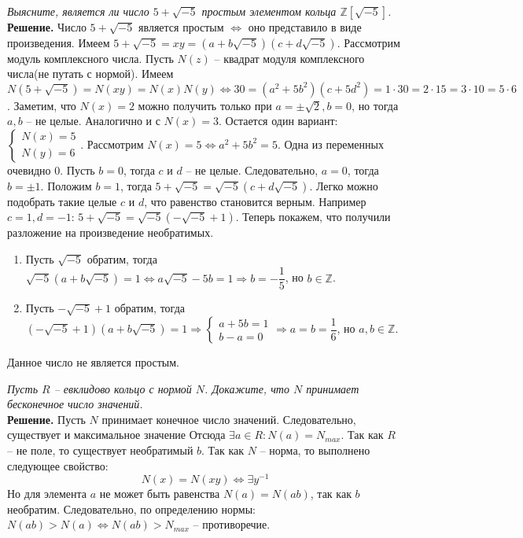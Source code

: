 \documentclass[a4paper, 12pt]{article}
\newcommand{\Z}{\mathbb{Z}}
\newcommand{\N}{\mathbb{N}}
\begin{document}
\begin{spacing}{1}
\begin{center}
\end{center}

\noindent \textit{Выясните, является ли число $5+\sqrt{-5}$ простым элементом кольца $\Z[\sqrt{-5}]$.}\\
\noindent \textbf{Решение.} Число $5+\sqrt{-5}$ является простым $\Leftrightarrow$ оно представило в виде произведения. Имеем $5+\sqrt{-5} = xy =(a + b\sqrt{-5})(c + d\sqrt{-5})$. Рассмотрим модуль комплексного числа. Пусть $N(z)$ -- квадрат модуля комплексного числа(не путать с нормой). Имеем $N(5+\sqrt{-5})= N(xy) = N(x)N(y) \Leftrightarrow30 = (a^2 + 5b^2)(c + 5d^2) = 1 \cdot 30 = 2 \cdot 15 = 3 \cdot 10 = 5\cdot 6$. Заметим, что $N(x) = 2$ можно получить только при $a = \pm\sqrt2, b = 0$, но тогда $a, b$ -- не целые. Аналогично и с $N(x) = 3$. Остается один вариант: $\begin{cases}
N(x) = 5\\N(y) = 6
\end{cases}$. Рассмотрим $N(x) = 5 \Leftrightarrow a^2 + 5b^2 = 5$. Одна из переменных очевидно 0. Пусть $b = 0$, тогда $c$ и $d$ -- не целые. Следовательно, $a = 0$, тогда $b = \pm 1$. Положим $b = 1$, тогда $5+\sqrt{-5} = \sqrt{-5}(c + d\sqrt{-5})$. Легко можно подобрать такие целые $c$ и $d$, что равенство становится верным. Например $c = 1, d = -1$:
$5+\sqrt{-5} = \sqrt{-5}(-\sqrt{-5} + 1)$. Теперь покажем, что получили разложение на произведение необратимых. 
\begin{enumerate}
	\item Пусть $\sqrt{-5}$ обратим, тогда $\sqrt{-5}(a + b\sqrt{-5}) = 1 \Leftrightarrow a\sqrt{-5} - 5b = 1 \Rightarrow b = -\dfrac{1}{5}$, но $b \in \Z$.
	\item Пусть $-\sqrt{-5} + 1$ обратим, тогда $(-\sqrt{-5} + 1)(a+b\sqrt{-5}) = 1 \Rightarrow \begin{cases}
	a + 5b = 1\\ b - a = 0\end{cases}\Rightarrow a = b = \dfrac{1}{6}$, но $a,b \in \Z$.
\end{enumerate}
Данное число не является простым.
\end{spacing}



\begin{center}
\end{center}

\noindent \textit{Пусть $R$ -- евклидово кольцо с нормой $N$. Докажите, что $N$ принимает бесконечное число значений.}\\
\noindent \textbf{Решение.} Пусть $N$ принимает конечное число значений. Следовательно, существует и максимальное значение Отсюда $\exists a \in R: N(a) = N_{max}$. Так как $R$ -- не поле, то существует необратимый $b$. Так как $N$ -- норма, то выполнено следующее свойство:
$$
N(x) = N(xy) \Leftrightarrow \exists y^{-1}
$$
Но для элемента $a$ не может быть равенства $N(a) = N(ab)$, так как $b$ необратим. Следовательно, по определению нормы: $N(ab) > N(a) \Leftrightarrow N(ab) > N_{max}$ -- противоречие. 
\end{document}
